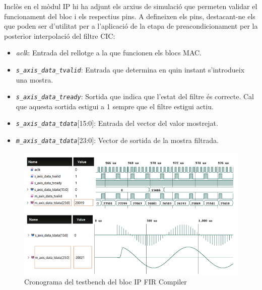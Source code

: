 \par Inclòs en el mòdul IP hi ha adjunt els arxius de simulació que permeten validar el funcionament del bloc i els respectius pins. A \cite{FIRcompiler} defineixen els pins, destacant-ne els que poden ser d'utilitat per a l'aplicació de la etapa de preacondicionament per la posterior interpolació del filtre CIC:
\begin{itemize}
    \item \textit{aclk}: Entrada del rellotge a la que funcionen els blocs MAC.
    \item \textit{\texttt{s\_axis\_data\_tvalid}}: Entrada que determina en quin instant s’introdueix una mostra.
    \item \textit{\texttt{s\_axis\_data\_tready}}: Sortida que indica que l’estat del filtre és correcte. Cal que aquesta sortida estigui a 1 sempre que el filtre estigui actiu. 
    \item \textit{\texttt{s\_axis\_data\_tdata}}[15:0]: Entrada del vector del valor mostrejat.
    \item \textit{\texttt{m\_axis\_data\_tdata}}[23:0]:  Vector de sortida de la mostra filtrada.
\end{itemize}
\begin{figure}[H]
    \centering
    \includegraphics[width=0.6\linewidth]{Images/FIRcompilerTestbench.png}
    \caption{Cronograma del testbench del bloc IP FIR Compiler \cite{TFGAmpClassD}}
    \label{figFIRtestbench}
\end{figure}


